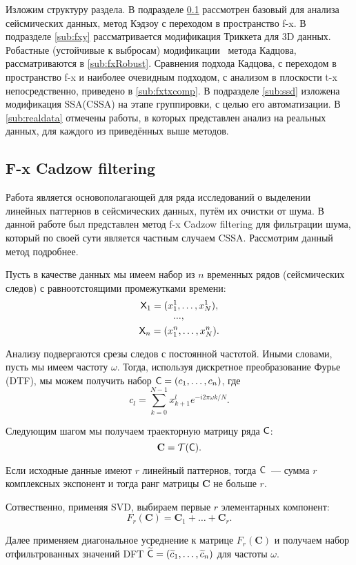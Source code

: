 \documentclass[specialist,
               substylefile = spbu.rtx,
               subf,href,colorlinks=true, 12pt]{disser}
\begin{document}
Изложим структуру раздела. В подразделе \ref{sub:fx} рассмотрен базовый для анализа сейсмических данных, метод Кэдзоу с переходом в пространство f-x. В подразделе \ref{sub:fxy} рассматривается модификация Триккета для 3D данных. Робастные (устойчивые к выбросам) модификации  метода Кадцова, рассматриваются в \ref{sub:fxRobust}. Сравнения подхода Кадцова, с переходом в пространство f-x и наиболее очевидным подходом, с анализом в плоскости t-x непосредственно, приведено в \ref{sub:fxtxcomp}. В подразделе \ref{sub:ssd} изложена модификация SSA(CSSA) на этапе группировки, с целью его автоматизации. В \ref{sub:realdata} отмечены работы, в которых представлен анализ на реальных данных, для каждого из приведённых выше методов. 

\subsection{F-x Cadzow filtering}
\label{sub:fx}

Работа \cite{Cadzow88} является основополагающей для ряда исследований о выделении линейных паттернов в сейсмических данных, путём их очистки от шума. В данной работе был представлен метод f-x Cadzow filtering для фильтрации шума, который по своей сути является частным случаем CSSA. Рассмотрим данный метод подробнее.

Пусть в качестве данных мы имеем набор из $n$ временных рядов (сейсмических следов) с равноотстоящими промежутками времени:
$$\textsf{X}_1 = (x^1_1, \ldots, x^1_{N}),$$
$$\ldots,$$
$$\textsf{X}_n = (x^n_1, \ldots, x^n_N).$$

Анализу подвергаются срезы следов с постоянной частотой. Иными словами, пусть мы имеем частоту $\omega$. Тогда, используя дискретное преобразование Фурье (DTF), мы можем получить набор $\textsf{C} = (c_1, \ldots, c_n)$, где
$$c_l = \sum_{k = 0}^{N-1} x^{l}_{k+1} e^{-i 2 \pi \omega k / N}.$$

Следующим шагом мы получаем траекторную матрицу ряда $\textsf{C}$:
$$\mathbf{C} = \mathcal{T}(\textsf{C}).$$

Если исходные данные имеют $r$ линейный паттернов, тогда $\textsf{C}$~--- сумма $r$ комплексных экспонент и тогда ранг матрицы $\mathbf{C}$ не больше $r$.

Сотвественно, применяя SVD, выбираем первые $r$ элементарных компонент:
$$F_r(\mathbf{C}) = \mathbf{C}_1 + \ldots + \mathbf{C}_r.$$

Далее применяем диагональное усреднение к матрице $F_r(\mathbf{C})$ и получаем набор отфильтрованных значений DFT $\widetilde{\textsf{C}} = (\widetilde{c}_1, \ldots, \widetilde{c}_n)$ для частоты $\omega$.
\end{document}
